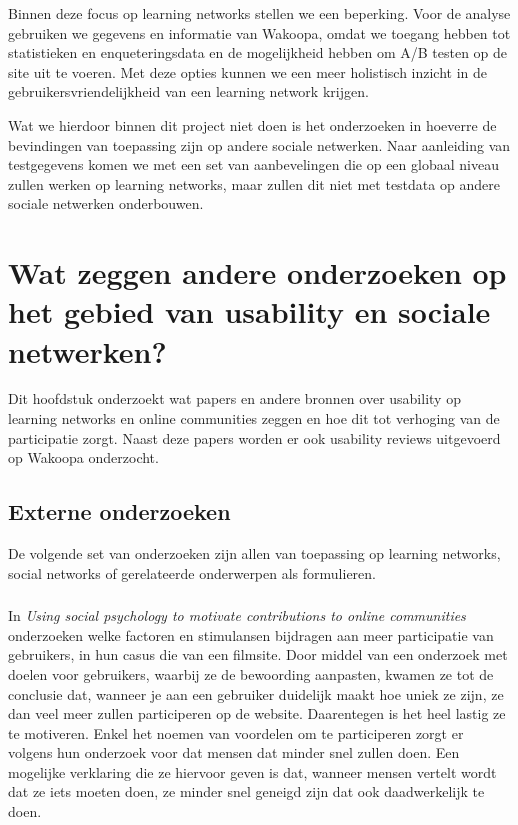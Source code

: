 \documentclass[a4paper, 10pt, pdftex]{report}
\begin{document}
    Binnen deze focus op learning networks stellen we een beperking. Voor de analyse gebruiken we gegevens en informatie van Wakoopa, omdat we toegang hebben tot statistieken en enqueteringsdata en de mogelijkheid hebben om A/B testen op de site uit te voeren. Met deze opties kunnen we een meer holistisch inzicht in de gebruikersvriendelijkheid van een learning network krijgen.

    Wat we hierdoor binnen dit project niet doen is het onderzoeken in hoeverre de bevindingen van toepassing zijn op andere sociale netwerken. Naar aanleiding van testgegevens komen we met een set van aanbevelingen die op een globaal niveau zullen werken op learning networks, maar zullen dit niet met testdata op andere sociale netwerken onderbouwen.

  \newpage
  \chapter{Wat zeggen andere onderzoeken op het gebied van usability en sociale netwerken?}
    \label{researchchapter}
    \newpage

    Dit hoofdstuk onderzoekt wat papers en andere bronnen over usability op learning networks en online communities zeggen en hoe dit tot verhoging van de participatie zorgt. Naast deze papers worden er ook usability reviews uitgevoerd op Wakoopa onderzocht.


    \section{Externe onderzoeken}
      De volgende set van onderzoeken zijn allen van toepassing op learning networks, social networks of gerelateerde onderwerpen als formulieren.
      \subsection{\cite{Beenen2004}}

      In \emph{Using social psychology to motivate contributions to online communities} onderzoeken \citeauthor{Beenen2004} welke factoren en stimulansen bijdragen aan meer participatie van gebruikers, in hun casus die van een filmsite. Door middel van een onderzoek met doelen voor gebruikers, waarbij ze de bewoording aanpasten, kwamen ze tot de conclusie dat, wanneer je aan een gebruiker duidelijk maakt hoe uniek ze zijn, ze dan veel meer zullen participeren op de website. Daarentegen is het heel lastig ze te motiveren. Enkel het noemen van voordelen om te participeren zorgt er volgens hun onderzoek voor dat mensen dat minder snel zullen doen. Een mogelijke verklaring die ze hiervoor geven is dat, wanneer mensen vertelt wordt dat ze iets moeten doen, ze minder snel geneigd zijn dat ook daadwerkelijk te doen.
\end{document}
